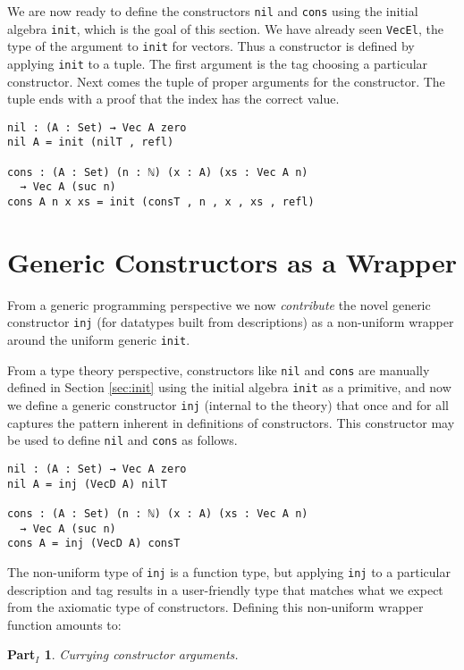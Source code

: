 \documentclass[preprint,nonatbib]{sigplanconf}
\newtheorem{myparti}{Part$_I$}
\newcommand{\refsec}[1]{Section \ref{sec:#1}}
\begin{document}
We are now ready to define the constructors {\tt nil} and
{\tt cons} using the initial algebra {\tt init}, which is the goal of
this section.
We have already seen
{\tt VecEl}, the type of the argument to {\tt init} for vectors.
Thus a constructor is defined by applying {\tt init} to a tuple. The
first argument is the tag choosing a particular constructor. Next comes
the tuple of proper arguments for the constructor. The tuple
ends with a proof that the index has the correct value.

\begin{verbatim}
nil : (A : Set) → Vec A zero
nil A = init (nilT , refl)

cons : (A : Set) (n : ℕ) (x : A) (xs : Vec A n)
  → Vec A (suc n)
cons A n x xs = init (consT , n , x , xs , refl)
\end{verbatim}

\section{Generic Constructors as a Wrapper}
\label{sec:inj}

From a generic programming perspective we now
{\it contribute} the novel generic
constructor {\tt inj} (for datatypes built from descriptions) as a
non-uniform wrapper around the uniform generic {\tt init}.

From a type theory perspective, constructors like
{\tt nil} and {\tt cons} are manually
defined in \refsec{init} using the initial algebra
{\tt init} as a primitive, and now we define a generic constructor
{\tt inj} (internal to the theory) that once and for all captures the
pattern inherent in definitions of constructors.  This constructor
may be used to define {\tt nil} and {\tt cons} as follows.

\begin{verbatim}
nil : (A : Set) → Vec A zero
nil A = inj (VecD A) nilT

cons : (A : Set) (n : ℕ) (x : A) (xs : Vec A n)
  → Vec A (suc n)
cons A = inj (VecD A) consT
\end{verbatim}

The non-uniform type of {\tt inj} is a function type, but applying
{\tt inj} to a particular description and tag results in a
user-friendly type that matches what we expect from the axiomatic
type of constructors. Defining this non-uniform wrapper function
amounts to:

\begin{myparti}
\label{parti:one}
Currying constructor arguments.
\end{myparti}
\end{document}

